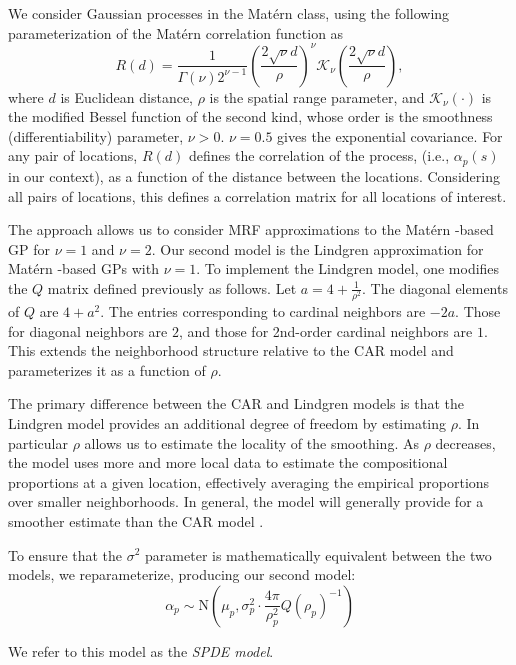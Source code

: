 \documentclass[12pt]{article}\usepackage[]{graphicx}\usepackage[]{color}
\newcommand{\matern}{Mat\'{e}rn }
\begin{document}
We consider Gaussian processes in the \matern class, using the following
parameterization of the \matern correlation function as 
\begin{equation}
R(d)=\frac{1}{\Gamma(\nu)2^{\nu-1}}\left(\frac{2\sqrt{\nu}d}{\rho}\right)^{\nu}\mathcal{K}_{\nu}\left(\frac{2\sqrt{\nu}d}{\rho}\right),\label{eq:Matern}
\end{equation}
where $d$ is Euclidean distance, $\rho$ is the spatial range parameter,
and $\mathcal{K}_{\nu}(\cdot)$ is the modified Bessel function of
the second kind, whose order is the smoothness (differentiability)
parameter, $\nu>0$. $\nu=0.5$ gives the exponential covariance.
For any pair of locations, $R(d)$ defines the correlation of the
process, (i.e., $\alpha_{p}(s)$ in our context), as a function of
the distance between the locations. Considering all pairs of locations,
this defines a correlation matrix for all locations of interest. 

The \citet{Lind:etal:2011} approach allows us to consider MRF approximations
to the \matern-based GP for $\nu=1$ and $\nu=2$. Our second model
is the Lindgren approximation for \matern-based GPs with $\nu=1$.
To implement the Lindgren model, one modifies the $Q$ matrix defined
previously as follows. Let $a=4+\frac{1}{\rho^{2}}$. The diagonal
elements of $Q$ are $4+a^{2}$. The entries corresponding to cardinal
neighbors are $-2a$. Those for diagonal neighbors are $2$, and those
for 2nd-order cardinal neighbors are $1$. This extends the neighborhood
structure relative to the CAR model and parameterizes it as a function
of $\rho$.

The primary difference between the CAR and Lindgren models is that
the Lindgren model provides an additional degree of freedom by estimating
$\rho$. In particular $\rho$ allows us to estimate the locality
of the smoothing. As $\rho$ decreases, the model uses more and more
local data to estimate the compositional proportions at a given location,
effectively averaging the empirical proportions over smaller neighborhoods.
In general, the \cite{Lind:etal:2011} model will generally provide
for a smoother estimate than the CAR model \citep{Paci:2013}. 

To ensure that the $\sigma^{2}$ parameter is mathematically equivalent
between the two models, we reparameterize, producing our second model:
\[
\alpha_{p}\sim\mbox{N}\left(\mu_{p},\sigma_{p}^{2}\cdot\frac{4\pi}{\rho_{p}^{2}}Q(\rho_{p})^{-1}\right)
\]


We refer to this model as the \emph{SPDE model}.
\end{document}
